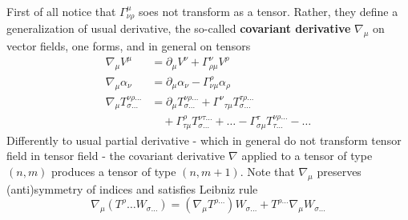 \documentclass[../main/main.tex]{subfiles}
\begin{document}
First of all notice that $\Gamma^\mu_{\nu\rho}$ soes not transform as a tensor. Rather, they define a generalization of usual derivative, the so-called \textbf{covariant derivative} $\nabla_\mu$ on vector fields, one forms, and in general on tensors
\begin{align*}
\nabla_\mu V^\mu&=\partial_\mu V^\nu+\Gamma^\nu_{\rho\mu}V^\rho\\
\nabla_\mu\alpha_\nu&=\partial_\mu\alpha_\nu-\Gamma^\rho_{\nu\mu}\alpha_\rho\\
\nabla_\mu T^{\nu\rho\dots}_{\sigma\dots}&=\partial_\mu T^{\nu\rho\dots}_{\sigma\dots}+{\Gamma^\nu}_{\tau\mu}T^{\tau\rho\dots}_{\sigma\dots}\\
&\quad+\Gamma^\rho_{\tau\mu}T^{\nu\tau\dots}_{\sigma\dots}+\dots-\Gamma^\tau_{\sigma\mu}T^{\nu\rho\dots}_{\tau\dots}-\dots
\end{align*}
Differently to usual partial derivative - which in general do not transform tensor field in tensor field - the covariant derivative $\nabla$ applied to a tensor of type $(n,m)$  produces a tensor of type $(n,m+1)$. Note that $\nabla_\mu$ preserves (anti)symmetry of indices and satisfies Leibniz rule
\[\nabla_\mu({T^\rho\dots}W_{\sigma\dots})=(\nabla_\mu T^{\rho\dots})W_{\sigma\dots}+T^{\rho\dots}\nabla_\mu W_{\sigma\dots}\]
\end{document}
